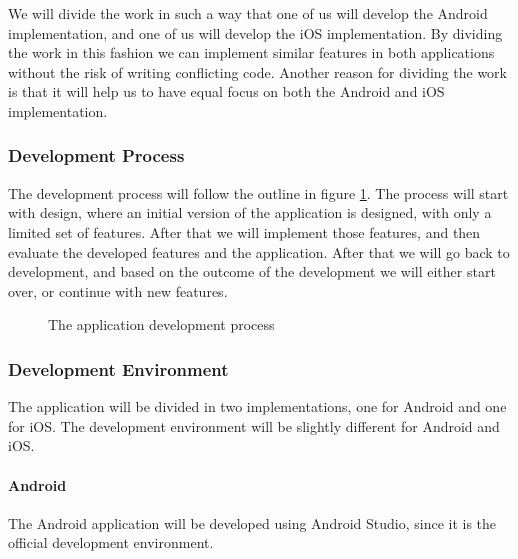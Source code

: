 \documentclass[12pt, a4paper, onecolumn]{article}
\begin{document}
	We will divide the work in such a way that one of us will develop the Android implementation, and one of us will develop the iOS implementation. By dividing the work in this fashion we can implement similar features in both applications without the risk of writing conflicting code. Another reason for dividing the work is that it will help us to have equal focus on both the Android and iOS implementation.
	
	\subsubsection{Development Process}
	
	The development process will follow the outline in figure \ref{fig:development}. The process will start with design, where an initial version of the application is designed, with only a limited set of features. After that we will implement those features, and then evaluate the developed features and the application. After that we will go back to development, and based on the outcome of the development we will either start over, or continue with new features.
	
	\begin{figure}[h]
		\centering
		\caption{The application development process}%
		\label{fig:development}%
	\end{figure}
	
	\subsubsection{Development Environment}
	
	The application will be divided in two implementations, one for Android and one for iOS. The development environment will be slightly different for Android and iOS. 
	
	\paragraph{Android}
	The Android application will be developed using Android Studio, since it is the official development environment.
	
\end{document}
